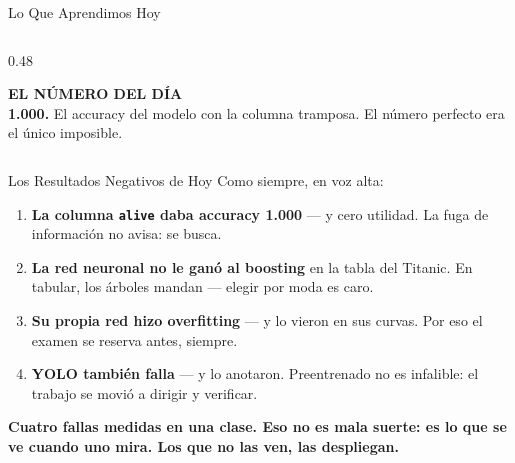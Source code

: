 \documentclass[aspectratio=169, 11pt]{beamer}
\begin{document}
\begin{frame}[shrink=8]{Lo Que Aprendimos Hoy}
\begin{columns}[T]
\begin{column}{0.48\textwidth}
{\begin{itemize}
      \end{itemize}}
      \vspace{5pt}
      \begin{tcolorbox}[colback=arcaGray, colframe=arcaRed, boxrule=0pt, leftrule=3pt,
        arc=3pt, left=6pt, right=6pt, top=4pt, bottom=4pt]
        {\scriptsize\color{arcaRed}\bfseries EL NÚMERO DEL DÍA}\\[3pt]
        {\scriptsize\color{textMuted}
         \textbf{1.000.} El accuracy del modelo con la columna tramposa.
         El número perfecto era el único imposible.}
      \end{tcolorbox}
    \end{column}
  \end{columns}
\end{frame}

\begin{frame}[shrink=5]{Los Resultados Negativos de Hoy}
  \vspace{2pt}
  {\scriptsize\color{textMuted}
   Como siempre, en voz alta:}
  \vspace{2pt}
  {\scriptsize\color{textMuted}
  \begin{enumerate}\setlength{\itemsep}{2pt}
    \item[{\color{arcaRed}\scriptsize\faTimes}]
      \textbf{La columna \texttt{alive} daba accuracy 1.000} --- y cero
      utilidad. La fuga de información no avisa: se busca.
    \item[{\color{arcaRed}\scriptsize\faTimes}]
      \textbf{La red neuronal no le ganó al boosting} en la tabla del
      Titanic. En tabular, los árboles mandan --- elegir por moda es caro.
    \item[{\color{arcaRed}\scriptsize\faTimes}]
      \textbf{Su propia red hizo overfitting} --- y lo vieron en sus curvas.
      Por eso el examen se reserva antes, siempre.
    \item[{\color{arcaRed}\scriptsize\faTimes}]
      \textbf{YOLO también falla} --- y lo anotaron. Preentrenado no es
      infalible: el trabajo se movió a dirigir y verificar.
  \end{enumerate}}
  \vspace{2pt}
  \begin{tcolorbox}[colback=arcaGray, colframe=arcaDark, boxrule=0pt,
    leftrule=4pt, arc=3pt, left=10pt, right=10pt, top=4pt, bottom=4pt]
    {\scriptsize\color{arcaDark}\bfseries
     Cuatro fallas medidas en una clase. Eso no es mala suerte: es lo que se
     ve cuando uno mira. Los que no las ven, las despliegan.}
  \end{tcolorbox}
\end{frame}
\end{document}

